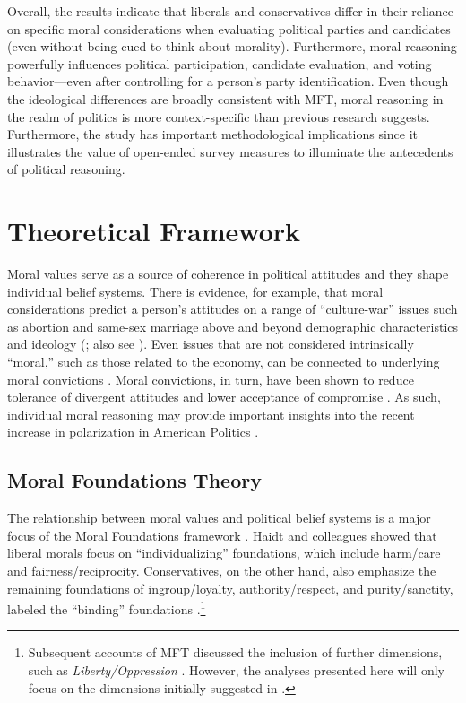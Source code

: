 \documentclass[12pt]{article}
\begin{document}
Overall, the results indicate that liberals and conservatives differ in their reliance on specific moral considerations when evaluating political parties and candidates (even without being cued to think about morality). Furthermore, moral reasoning powerfully influences political participation, candidate evaluation, and voting behavior---even after controlling for a person’s party identification. Even though the ideological differences are broadly consistent with MFT, moral reasoning in the realm of politics is more context-specific than previous research suggests. Furthermore, the study has important methodological implications since it illustrates the value of open-ended survey measures to illuminate the antecedents of political reasoning.


\section{Theoretical Framework}

Moral values serve as a source of coherence in political attitudes and they shape individual belief systems. There is evidence, for example, that moral considerations predict a person's attitudes on a range of ``culture-war'' issues such as abortion and same-sex marriage above and beyond demographic characteristics and ideology (\citealt{koleva2012tracing}; also see \citealt{clifford2015concerns}). Even issues that are not considered intrinsically ``moral,'' such as those related to the economy, can be connected to underlying moral convictions \citep{ryan2014reconsidering}. Moral convictions, in turn, have been shown to reduce tolerance of divergent attitudes and lower acceptance of compromise \citep[][]{skitka2010psychology,ryan2016no}. As such, individual moral reasoning may provide important insights into the recent increase in polarization in American Politics \citep{iyengar2015fear}.


\subsection{Moral Foundations Theory}

The relationship between moral values and political belief systems is a major focus of the Moral Foundations framework \citep[c.f.][]{haidt2012righteous}. Haidt and colleagues showed that liberal morals focus on ``individualizing'' foundations, which include harm/care and fairness/reciprocity. Conservatives, on the other hand, also emphasize the remaining foundations of ingroup/loyalty, authority/respect, and purity/sanctity, labeled the ``binding'' foundations \citep{haidt2007morality,graham2009liberals}.\footnote{Subsequent accounts of MFT discussed the inclusion of further dimensions, such as \textit{Liberty/Oppression} \citep[c.f.][]{graham2013moral,haidt2012righteous}. However, the analyses presented here will only focus on the dimensions initially suggested in \citet{haidt2008moral}.}
\end{document}
